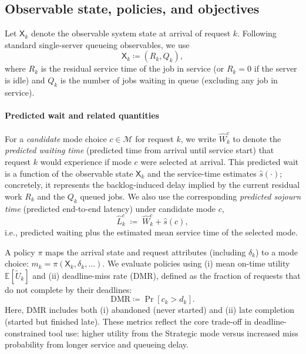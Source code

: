 \documentclass[fleqn,12pt,lineno]{wlpeerj}
\begin{document}
\subsection{Observable state, policies, and objectives}
\label{sec:state_objective}

Let $\mathsf{X}_k$ denote the observable system state at arrival of request $k$. Following standard single-server queueing observables, we use
\begin{equation}
\mathsf{X}_k \coloneqq (R_k, Q_k),
\end{equation}
where $R_k$ is the residual service time of the job in service (or $R_k=0$ if the server is idle) and $Q_k$ is the number of jobs waiting in queue (excluding any job in service).

\paragraph{Predicted wait and related quantities}
For a \emph{candidate} mode choice $c \in \mathcal{M}$ for request $k$, we write $\widehat{W}_k^c$ to denote the \emph{predicted waiting time} (predicted time from arrival until service start) that request $k$ would experience if mode $c$ were selected at arrival. This predicted wait is a function of the observable state $\mathsf{X}_k$ and the service-time estimates $\hat{s}(\cdot)$; concretely, it represents the backlog-induced delay implied by the current residual work $R_k$ and the $Q_k$ queued jobs.
We also use the corresponding \emph{predicted sojourn time} (predicted end-to-end latency) under candidate mode $c$,
\[
\widehat{L}_k^c \;\coloneqq\; \widehat{W}_k^c + \hat{s}(c),
\]
i.e., predicted waiting plus the estimated mean service time of the selected mode.

A policy $\pi$ maps the arrival state and request attributes (including $\delta_k$) to a mode choice: $m_k = \pi(\mathsf{X}_k, \delta_k, \ldots)$. We evaluate policies using (i) mean on-time utility $\mathbb{E}[\tilde{U}_k]$ and (ii) deadline-miss rate (DMR), defined as the fraction of requests that do not complete by their deadlines:
\begin{equation}
\mathrm{DMR} \coloneqq \Pr[c_k > d_k].
\end{equation}
Here, DMR includes both (i) abandoned (never started) and (ii) late completion (started but finished late). These metrics reflect the core trade-off in deadline-constrained tool use: higher utility from the Strategic mode versus increased miss probability from longer service and queueing delay.
\end{document}
